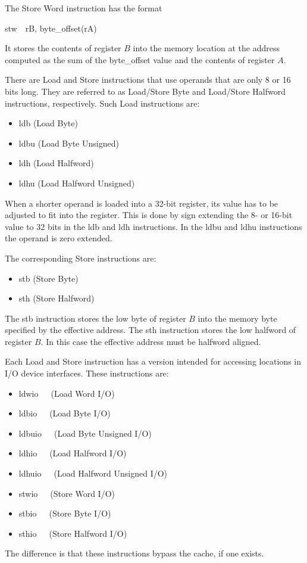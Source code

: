 \documentclass[11pt, twoside, pdftex]{article}
\begin{document}
The Store Word instruction has the format
\begin{center}
{\sf stw~~rB, byte\_offset(rA)}
\end{center}
\noindent 
It stores the contents of register $B$ into the memory location at the address
computed as the sum of the byte\_offset value and the contents of register $A$. 
 
 
There are Load and Store instructions that use operands that are only 8 or 16 bits long.
They are referred to as Load/Store Byte and Load/Store Halfword instructions, respectively.
Such Load instructions are: 
\begin{itemize}
\item {\sf ldb} (Load Byte)
\item {\sf ldbu} (Load Byte Unsigned)
\item {\sf ldh} (Load Halfword)
\item {\sf ldhu} (Load Halfword Unsigned)
\end{itemize}
\noindent
When a shorter operand is loaded into a 32-bit register, its value has to be adjusted
to fit into the register. This is done by sign extending the 8- or 16-bit value to 32 bits
in the {\sf ldb} and {\sf ldh} instructions. In the {\sf ldbu} and {\sf ldhu} instructions
the operand is zero extended.
 

The corresponding Store instructions are: 
\begin{itemize}
\item {\sf stb} (Store Byte)
\item {\sf sth} (Store Halfword)
\end{itemize}
\noindent
The {\sf stb} instruction stores the low byte of register $B$ into the memory byte
specified by the effective address. The {\sf sth} instruction stores the low halfword
of register $B$. In this case the effective address must be halfword aligned.
 

Each Load and Store instruction has a version intended for accessing
locations in I/O device interfaces. These instructions are: 
\begin{itemize}
\item {\sf ldwio}~~~(Load Word I/O)
\item {\sf ldbio}~~~(Load Byte I/O)
\item {\sf ldbuio}~~~(Load Byte Unsigned I/O)
\item {\sf ldhio}~~~(Load Halfword I/O)
\item {\sf ldhuio}~~~(Load Halfword Unsigned I/O)
\item {\sf stwio}~~~(Store Word I/O)
\item {\sf stbio}~~~(Store Byte I/O)
\item {\sf sthio}~~~(Store Halfword I/O)
\end{itemize}
\noindent
The difference is that these instructions bypass the cache, if one exists.
\end{document}
